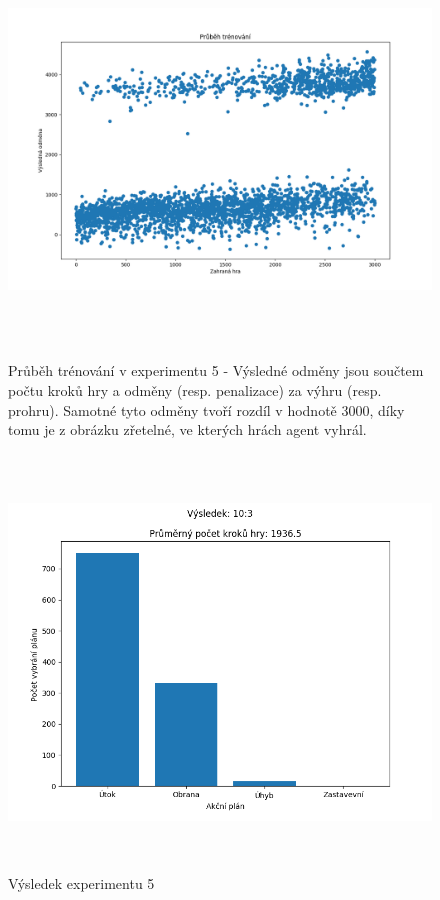 \begin{figure}[p]\centering
\includegraphics[width=145mm, height=110mm]{./Obrazky/Experiment05Training.png}
\caption{Průběh trénování v experimentu 5 - Výsledné odměny jsou součtem počtu kroků hry a odměny (resp. penalizace) za výhru (resp. prohru). Samotné tyto odměny tvoří rozdíl v hodnotě 3000, díky tomu je z obrázku zřetelné, ve kterých hrách agent vyhrál.}
\label{Průběh trénování experimentu 06}
\end{figure}




\begin{figure}[p]\centering
\includegraphics[width=145mm, height=110mm]{./Obrazky/Experiment05Results.png}
\caption{Výsledek experimentu 5}
\label{Průběh trénování experimentu 05}
\end{figure}


